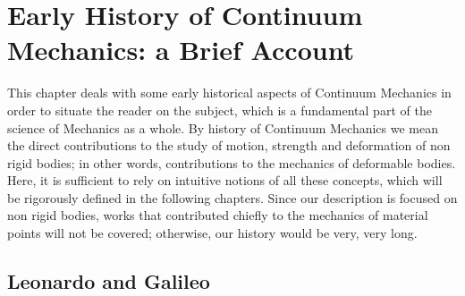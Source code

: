 \chapter{Early History of Continuum Mechanics: a Brief Account}\label{ch:IntroCM}


This chapter deals with some early historical aspects of Continuum Mechanics in order to situate the reader on the subject, which is a fundamental part of the science of Mechanics as a whole. By history of Continuum Mechanics we mean the direct contributions to the study of motion, strength and deformation of non rigid bodies; in other words, contributions to the mechanics of deformable bodies. Here, it is sufficient to rely on intuitive notions of all these concepts, which will be rigorously defined in the following chapters. Since our description is focused on non rigid bodies, works that contributed chiefly to the mechanics of material points will not be covered; otherwise, our history would be very, very long.  


\section{Leonardo and Galileo}


